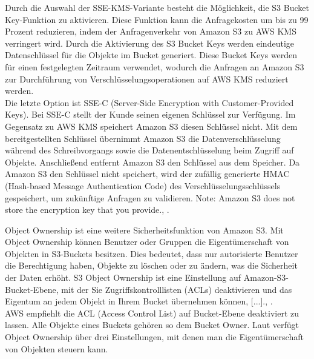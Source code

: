 Durch die Auswahl der SSE-KMS-Variante besteht die Möglichkeit, die S3 Bucket Key-Funktion zu aktivieren. Diese Funktion kann die Anfragekosten um bis zu 99 Prozent reduzieren, indem der Anfragenverkehr von Amazon S3 zu AWS KMS verringert wird. Durch die Aktivierung des S3 Bucket Keys werden eindeutige Datenschlüssel für die Objekte im Bucket generiert. Diese Bucket Keys werden für einen festgelegten Zeitraum verwendet, wodurch die Anfragen an Amazon S3 zur Durchführung von Verschlüsselungsoperationen auf AWS KMS reduziert werden.\\

Die letzte Option ist SSE-C (Server-Side Encryption with Customer-Provided Keys). Bei SSE-C stellt der Kunde seinen eigenen Schlüssel zur Verfügung. Im Gegensatz zu AWS KMS speichert Amazon S3 diesen Schlüssel nicht. Mit dem bereitgestellten Schlüssel übernimmt Amazon S3 die Datenverschlüsselung während des Schreibvorgangs sowie die Datenentschlüsselung beim Zugriff auf Objekte. Anschließend entfernt Amazon S3 den Schlüssel aus dem Speicher. Da Amazon S3 den Schlüssel nicht speichert, wird der zufällig generierte HMAC (Hash-based Message Authentication Code) des Verschlüsselungsschlüssels gespeichert, um zukünftige Anfragen zu validieren. \glqq Note: Amazon S3 does not store the encryption key that you provide.\grqq, \cite{aws-sse-c}.

\newpage

Object Ownership ist eine weitere Sicherheitsfunktion von Amazon S3. Mit Object Ownership können Benutzer oder Gruppen die Eigentümerschaft von Objekten in S3-Buckets besitzen. Dies bedeutet, dass nur autorisierte Benutzer die Berechtigung haben, Objekte zu löschen oder zu ändern, was die Sicherheit der Daten erhöht. \glqq S3 Object Ownership ist eine Einstellung auf Amazon-S3-Bucket-Ebene, mit der Sie Zugriffskontrolllisten (ACLs) deaktivieren und das Eigentum an jedem Objekt in Ihrem Bucket übernehmen können, [...].\grqq, \cite{aws-iam-s3}.\\

AWS empfiehlt die ACL (Access Control List) auf Bucket-Ebene deaktiviert zu lassen. Alle Objekte eines Buckets gehören so dem Bucket Owner. Laut \citeauthor{aws-iam-s3} verfügt Object Ownership über drei Einstellungen, mit denen man die Eigentümerschaft von Objekten steuern kann.

